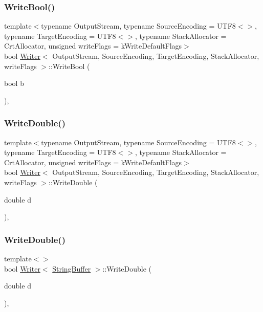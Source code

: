 \subsubsection{\texorpdfstring{Write\+Bool()}{WriteBool()}}
{\footnotesize\ttfamily template$<$typename Output\+Stream, typename Source\+Encoding = U\+T\+F8$<$$>$, typename Target\+Encoding = U\+T\+F8$<$$>$, typename Stack\+Allocator = Crt\+Allocator, unsigned write\+Flags = k\+Write\+Default\+Flags$>$ \\
bool \hyperlink{classWriter}{Writer}$<$ Output\+Stream, Source\+Encoding, Target\+Encoding, Stack\+Allocator, write\+Flags $>$\+::Write\+Bool (\begin{DoxyParamCaption}\item[{bool}]{b }\end{DoxyParamCaption})\hspace{0.3cm}{\ttfamily [inline]}, {\ttfamily [protected]}}

\mbox{\label{classWriter_ae7a0fc4740681d845d92c1213bd25aa1}} 
\subsubsection{\texorpdfstring{Write\+Double()}{WriteDouble()}\hspace{0.1cm}{\footnotesize\ttfamily [1/2]}}
{\footnotesize\ttfamily template$<$typename Output\+Stream, typename Source\+Encoding = U\+T\+F8$<$$>$, typename Target\+Encoding = U\+T\+F8$<$$>$, typename Stack\+Allocator = Crt\+Allocator, unsigned write\+Flags = k\+Write\+Default\+Flags$>$ \\
bool \hyperlink{classWriter}{Writer}$<$ Output\+Stream, Source\+Encoding, Target\+Encoding, Stack\+Allocator, write\+Flags $>$\+::Write\+Double (\begin{DoxyParamCaption}\item[{double}]{d }\end{DoxyParamCaption})\hspace{0.3cm}{\ttfamily [inline]}, {\ttfamily [protected]}}

\mbox{\label{classWriter_af317e1d24249b8c68503a6253c703bd2}} 
\subsubsection{\texorpdfstring{Write\+Double()}{WriteDouble()}\hspace{0.1cm}{\footnotesize\ttfamily [2/2]}}
{\footnotesize\ttfamily template$<$$>$ \\
bool \hyperlink{classWriter}{Writer}$<$ \hyperlink{fwd_8h_ab956b6537825abf8aac4112e81cfad7e}{String\+Buffer} $>$\+::Write\+Double (\begin{DoxyParamCaption}\item[{double}]{d }\end{DoxyParamCaption})\hspace{0.3cm}{\ttfamily [inline]}, {\ttfamily [protected]}}

